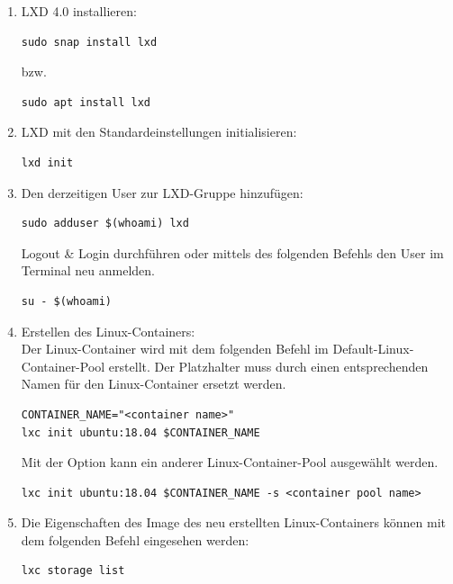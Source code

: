 \begin{enumerate}[label*=\arabic*.]
    \item LXD 4.0 installieren:\
        \begin{lstlisting}[style=bash]
sudo snap install lxd
        \end{lstlisting}
    bzw.
        \begin{lstlisting}[style=bash]
sudo apt install lxd
        \end{lstlisting}

    \item LXD mit den Standardeinstellungen initialisieren:\
        \begin{lstlisting}[style=bash]
lxd init
        \end{lstlisting}

    \item Den derzeitigen User zur LXD-Gruppe hinzufügen:\
        \begin{lstlisting}[style=bash]
sudo adduser $(whoami) lxd
        \end{lstlisting}
        Logout \& Login durchführen oder mittels des folgenden Befehls den User im Terminal neu anmelden.
        \begin{lstlisting}[style=bash]
su - $(whoami)
        \end{lstlisting}

    \item Erstellen des Linux-Containers:\\
        Der Linux-Container wird mit dem folgenden Befehl im Default-Linux-Container-Pool erstellt. Der Platzhalter  muss durch einen entsprechenden Namen für den Linux-Container ersetzt werden.
        \begin{lstlisting}[style=bash]
CONTAINER_NAME="<container name>"
lxc init ubuntu:18.04 $CONTAINER_NAME
        \end{lstlisting}
        Mit der Option  kann ein anderer Linux-Container-Pool ausgewählt werden.
        \begin{lstlisting}[style=bash]
lxc init ubuntu:18.04 $CONTAINER_NAME -s <container pool name>
        \end{lstlisting}

    \item Die Eigenschaften des Image des neu erstellten Linux-Containers können mit dem folgenden Befehl eingesehen werden:\
        \begin{lstlisting}[style=bash]
lxc storage list
        \end{lstlisting}


\end{enumerate}
